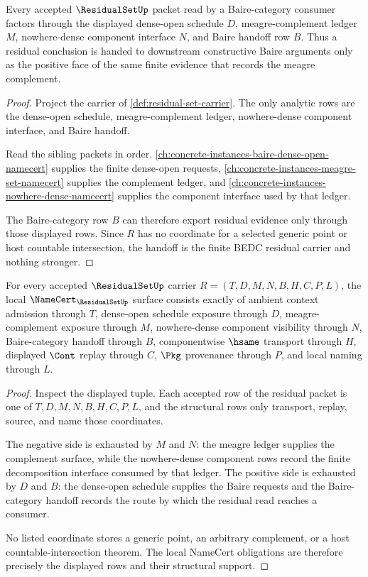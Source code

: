 \begin{theorem}
\label{thm:residual-set-baire-handoff}
Every accepted $\ResidualSetUp$ packet read by a Baire-category consumer factors through the displayed dense-open schedule $D$, meagre-complement ledger $M$, nowhere-dense component interface $N$, and Baire handoff row $B$. Thus a residual conclusion is handed to downstream constructive Baire arguments only as the positive face of the same finite evidence that records the meagre complement.
\end{theorem}
\begin{proof}
Project the carrier of \autoref{def:residual-set-carrier}. The only analytic rows are the dense-open schedule, meagre-complement ledger, nowhere-dense component interface, and Baire handoff.

Read the sibling packets in order. \autoref{ch:concrete-instances-baire-dense-open-namecert} supplies the finite dense-open requests, \autoref{ch:concrete-instances-meagre-set-namecert} supplies the complement ledger, and \autoref{ch:concrete-instances-nowhere-dense-namecert} supplies the component interface used by that ledger.

The Baire-category row $B$ can therefore export residual evidence only through those displayed rows. Since $R$ has no coordinate for a selected generic point or host countable intersection, the handoff is the finite BEDC residual carrier and nothing stronger.
\end{proof}

\begin{theorem}
\label{thm:residual-set-namecert-obligations}
For every accepted $\ResidualSetUp$ carrier $R=(T,D,M,N,B,H,C,P,L)$, the local $\NameCert_{\ResidualSetUp}$ surface consists exactly of ambient context admission through $T$, dense-open schedule exposure through $D$, meagre-complement exposure through $M$, nowhere-dense component visibility through $N$, Baire-category handoff through $B$, componentwise $\hsame$ transport through $H$, displayed $\Cont$ replay through $C$, $\Pkg$ provenance through $P$, and local naming through $L$.
\end{theorem}
\begin{proof}
Inspect the displayed tuple. Each accepted row of the residual packet is one of $T,D,M,N,B,H,C,P,L$, and the structural rows only transport, replay, source, and name those coordinates.

The negative side is exhausted by $M$ and $N$: the meagre ledger supplies the complement surface, while the nowhere-dense component rows record the finite decomposition interface consumed by that ledger. The positive side is exhausted by $D$ and $B$: the dense-open schedule supplies the Baire requests and the Baire-category handoff records the route by which the residual read reaches a consumer.

No listed coordinate stores a generic point, an arbitrary complement, or a host countable-intersection theorem. The local NameCert obligations are therefore precisely the displayed rows and their structural support.
\end{proof}

